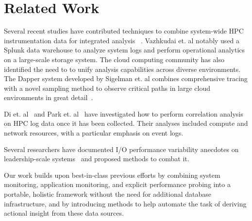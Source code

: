 \section{Related Work}

Several recent studies have contributed techniques to combine
system-wide HPC instrumentation data for integrated
analysis~\cite{Lockwood2017,Vazhkudai2017guide,Agelastos2014ldms,Kunkel2014siox}
. Vazhkudai et. al notably used a Splunk data warehouse to analyze system
logs and perform operational analytics on a large-scale storage system.
The cloud computing community has also identified the need to to unify
analysis capabilities across diverse environments. The Dapper system
developed by Sigelman et. al combines comprehensive tracing with a novel
sampling method to observe critical paths in large cloud environments in great
detail~\cite{Sigelman2010dapper}.

Di et. al~\cite{7973730} and Park et. al~\cite{Park2017BigDM} have
investigated how to perform correlation analysis on HPC log data once it has been
collected.  Their analyses included compute and network resources, with a
particular emphasis on event logs.

Several researchers have documented 
I/O performance variability anecdotes on leadership-scale
systems~\cite{Lofstead2010,Yildiz2016,carns2011understanding} and proposed
methods to combat it.  

Our work builds upon best-in-class previous efforts by combining system
monitoring, application monitoring, and explicit performance probing
into a portable, holistic framework without the need for additional database
infrastructure, and by introducing methods to help automate the task
of deriving actional insight from these data sources.
